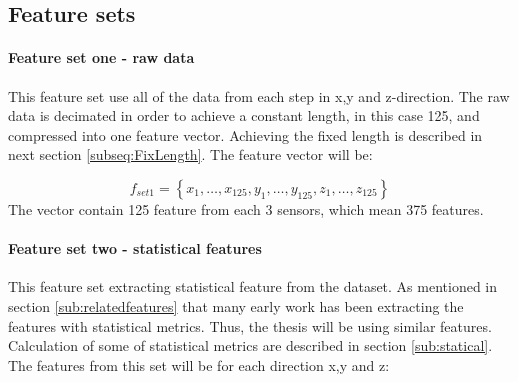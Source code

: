 \documentclass[USenglish]{ifimaster}  %
\begin{document}

	
	
	
	
	\subsection{Feature sets}\label{sec:featuresets}
	\paragraph{Feature set one - raw data} This feature set use all of the data from each step in x,y and z-direction. The raw data is decimated in order to achieve a constant length, in this case 125, and compressed into one feature vector. Achieving the fixed length is described in next section \ref{subseq:FixLength}. The feature vector will be:
	
	\begin{equation} \label{eq:f1}
	f_{set1}= \left\{ x_1,\dotsc,x_{125},y_1, \dotsc,y_{125},z_1,\dotsc,z_{125} \right\}
	\end{equation}
	The vector contain 125 feature from each 3 sensors, which mean 375 features.
	
	
	\paragraph{Feature set two - statistical features} This feature set extracting statistical feature from the dataset. As mentioned in section \ref{sub:relatedfeatures} that many early work has been extracting the features with statistical metrics. Thus, the thesis will be using similar features. Calculation of some of statistical metrics are described in section \ref{sub:statical}. The features from this set will be for each direction x,y and z: 
	
\end{document}
